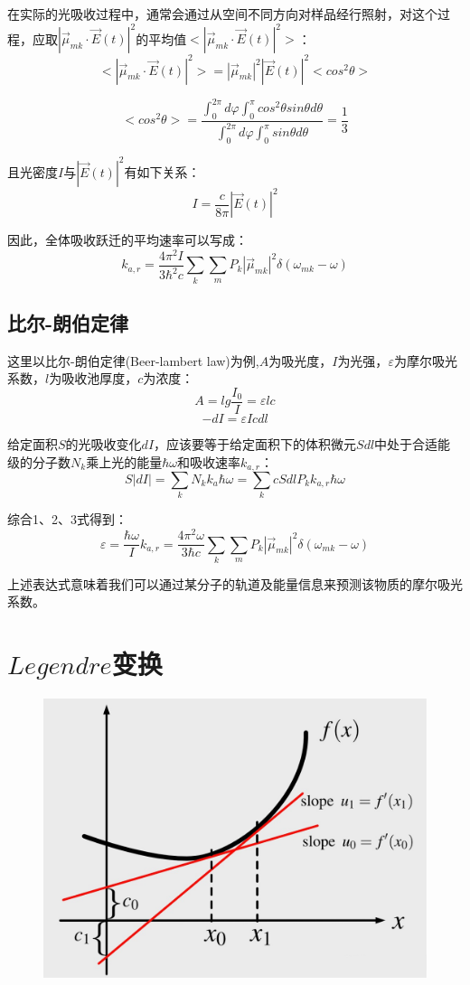在实际的光吸收过程中，通常会通过从空间不同方向对样品经行照射，对这个过程，应取$|\overrightarrow{\mu}_{mk} \cdot \overrightarrow{E}(t)|^2$的平均值$<|\overrightarrow{\mu}_{mk} \cdot \overrightarrow{E}(t)|^2>$：
\[<|\overrightarrow{\mu}_{mk} \cdot \overrightarrow{E}(t)|^2>=|\overrightarrow{\mu}_{mk}|^2|\overrightarrow{E}(t)|^2<cos^2 \theta>\]

\[<cos^2 \theta>=\frac{\int_0^{2\pi}d\varphi \int_0^{\pi}cos^2 \theta sin \theta d\theta}{\int_0^{2\pi}d\varphi \int_0^{\pi} sin \theta d\theta}=\frac{1}{3}\]

且光密度$I$与$|\overrightarrow{E}(t)|^2$有如下关系：
\[I=\frac{c}{8 \pi}|\overrightarrow{E}(t)|^2\]

因此，全体吸收跃迁的平均速率可以写成：
\[k_{a,r}=\frac{4\pi^2 I}{3 \hbar^2c}\sum_k\sum_m P_k |\overrightarrow{\mu}_{mk}|^2 \delta(\omega_{mk}-\omega)\]

\subsection{比尔-朗伯定律}

这里以比尔-朗伯定律(Beer-lambert law)为例,$A$为吸光度，$I$为光强，$\varepsilon$为摩尔吸光系数，$l$为吸收池厚度，$c$为浓度：
\[A=lg \frac{I_0}{I}=\varepsilon lc \tag{1}\]
\[-dI=\varepsilon Icdl \tag{2}\]

给定面积$S$的光吸收变化$dI$，应该要等于给定面积下的体积微元$Sdl$中处于合适能级的分子数$N_k$乘上光的能量$\hbar \omega$和吸收速率$k_{a,r}$：
\[S|dI|=\sum_kN_kk_a\hbar \omega=\sum_kcSdlP_kk_{a,r}\hbar \omega \tag{3}\]

综合1、2、3式得到：
\[\varepsilon=\frac{\hbar \omega}{I}k_{a,r}=\frac{4\pi^2 \omega}{3 \hbar c}\sum_k\sum_m P_k |\overrightarrow{\mu}_{mk}|^2 \delta(\omega_{mk}-\omega)\]

上述表达式意味着我们可以通过某分子的轨道及能量信息来预测该物质的摩尔吸光系数。

\section{$Legendre$变换}

\begin{figure}[htbp]
    \centering
    \includegraphics[scale=0.2]{./fig/Legendre Transform/1.png}
\end{figure}

